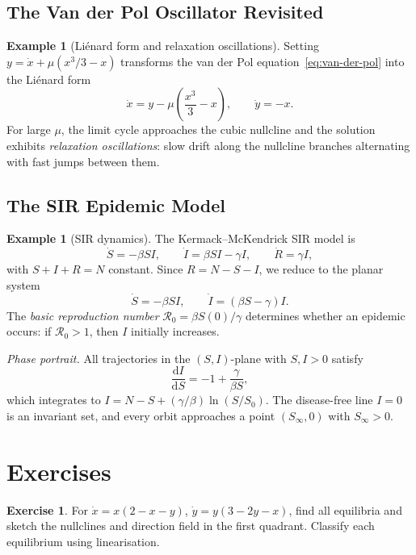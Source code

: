 \documentclass[12pt,a4paper,openany]{book}
\theoremstyle{definition}
\newtheorem{example}[definition]{Example}
\newtheorem{exercise}{Exercise}[chapter]
\theoremstyle{plain}
\theoremstyle{remark}
\newcommand{\dd}{\mathrm{d}}
\begin{document}
\subsection{The Van der Pol Oscillator Revisited}
\label{subsec:vdp-worked}

\begin{example}[Li\'enard form and relaxation oscillations]
\label{ex:vdp-lienard}
Setting $y = \dot{x}+\mu(x^{3}/3-x)$ transforms the van der Pol
equation~\eqref{eq:van-der-pol} into the Li\'enard form
\[
  \dot{x} = y - \mu\!\left(\frac{x^{3}}{3}-x\right), \qquad
  \dot{y} = -x.
\]
For large $\mu$, the limit cycle approaches the cubic nullcline and
the solution exhibits \emph{relaxation oscillations}:
slow drift along the nullcline branches alternating with fast jumps
between them.
\end{example}

\subsection{The SIR Epidemic Model}
\label{subsec:sir-analysis}

\begin{example}[SIR dynamics]
\label{ex:sir-nonlinear}
The Kermack--McKendrick SIR model is
\[
  \dot{S} = -\beta SI,\qquad
  \dot{I} = \beta SI - \gamma I,\qquad
  \dot{R} = \gamma I,
\]
with $S+I+R=N$ constant. Since $R=N-S-I$, we reduce to the planar
system
\[
  \dot{S} = -\beta SI,\qquad
  \dot{I} = (\beta S - \gamma) I.
\]
The \emph{basic reproduction number}
$\mathcal{R}_{0}=\beta S(0)/\gamma$ determines whether an epidemic
occurs: if $\mathcal{R}_{0}>1$, then $I$ initially increases.

\emph{Phase portrait.} All trajectories in the $(S,I)$-plane with
$S,I>0$ satisfy
\[
  \frac{\dd I}{\dd S} = -1 + \frac{\gamma}{\beta S},
\]
which integrates to $I = N - S + (\gamma/\beta)\ln(S/S_{0})$. The
disease-free line $I=0$ is an invariant set, and every orbit
approaches a point $(S_{\infty},0)$ with $S_{\infty}>0$.
\end{example}

\section{Exercises}
\label{sec:ch9-exercises}

\begin{exercise}
\label{exer:nullclines-practice}
For $\dot{x}=x(2-x-y)$, $\dot{y}=y(3-2y-x)$, find all equilibria
and sketch the nullclines and direction field in the first quadrant.
Classify each equilibrium using linearisation.
\end{exercise}
\end{document}
